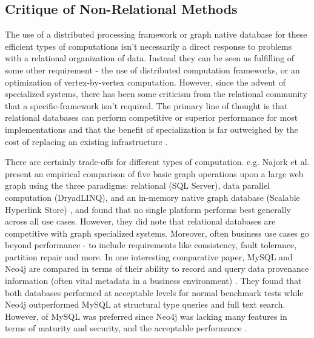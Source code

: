 \documentclass[11pt,letterpaper]{article}
\begin{document}
%

\subsection*{Critique of Non-Relational Methods}

The use of a distributed processing framework or graph native database for these efficient types of computations isn't necessarily a direct response to problems with a relational organization of data. Instead they can be seen as fulfilling of some other requirement - the use of distributed computation frameworks, or an optimization of vertex-by-vertex computation. However, since the advent of specialized systems, there has been some criticism from the relational community that a specific-framework isn't required. The primary line of thought is that relational databases can perform competitive or superior performance for most implementations and that the benefit of specialization is far outweighed by the cost of replacing an existing infrastructure \cite{welc_graph_2013}.

There are certainly trade-offs for different types of computation. e.g. Najork et al. present an empirical comparison of five basic graph operations upon a large web graph using the three paradigms: relational (SQL Server), data parallel computation (DryadLINQ), and an in-memory native graph database (Scalable Hyperlink Store) \cite{najork_hammers_2012}, and found that no single platform performs best generally across all use cases. However, they did note that relational databases are competitive with graph specialized systems. Moreover, often business use cases go beyond performance - to include requirements like consistency, fault tolerance, partition repair and more. In one interesting comparative paper, MySQL and Neo4j are compared in terms of their ability to record and query data provenance information (often vital metadata in a business environment) \cite{vicknair_comparison_2010}. They found that both databases performed at acceptable levels for normal benchmark tests while Neo4j outperformed MySQL at structural type queries and full text search. However, of MySQL was preferred since Neo4j was lacking many features in terms of maturity and security, and the acceptable performance .
\end{document}
